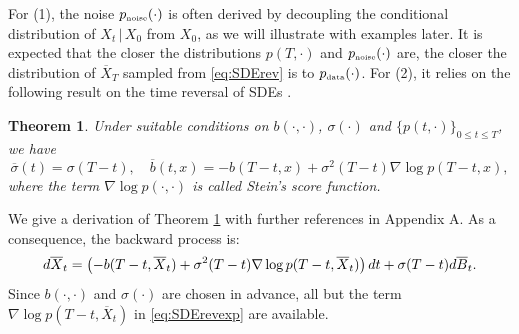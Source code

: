 \documentclass[letterpaper,11pt,reqno]{amsart}
\newtheorem{theorem}{Theorem}[section]
\numberwithin{equation}{section}
\begin{document}
\quad For (1), the noise $p_{\tiny \mbox{noise}}(\cdot)$ is often derived
by decoupling the conditional distribution of $X_t \,|\, X_0$ from $X_0$,
as we will illustrate with examples later.
It is expected that the closer the distributions $p(T, \cdot)$ and $p_{\tiny \mbox{noise}}(\cdot)$ are,
the closer the distribution of 
$\overline{X}_T$ sampled from \eqref{eq:SDErev} is to $p_{\tiny \mbox{data}}(\cdot)$.
For (2), it relies on the following result on the time reversal of SDEs \cite{Ander82, HP86}.
\begin{theorem}
\label{thm:SDErev}
Under suitable conditions on $b(\cdot, \cdot)$, $\sigma(\cdot)$ and $\{p(t, \cdot)\}_{0 \le t \le T}$, 
we have
\begin{equation}
\label{eq:coefrev}
\overline{\sigma}(t) = \sigma(T-t), \quad
\overline{b}(t,x) = -b(T-t, x) + \sigma^2(T-t)  \nabla \log p (T-t,x),
\end{equation}
where the term $\nabla \log p(\cdot, \cdot)$ is called Stein's score function.
\end{theorem}

\quad We give a derivation of Theorem \ref{thm:SDErev} with further references in Appendix A.
As a consequence, the backward process is:
\begin{equation}
\label{eq:SDErevexp}
d\overline{X}_t = \left(-b(T-t, \overline{X}_t) + \sigma^2(T-t) \nabla \log p(T-t, \overline{X}_t) \right)dt  \\+ \sigma(T-t) d\overline{B}_t.
\end{equation}
Since $b(\cdot, \cdot)$ and $\sigma(\cdot)$ are chosen in advance, 
all but the term $\nabla \log p(T-t, \overline{X}_t)$ in \eqref{eq:SDErevexp} are available. 
\end{document}
